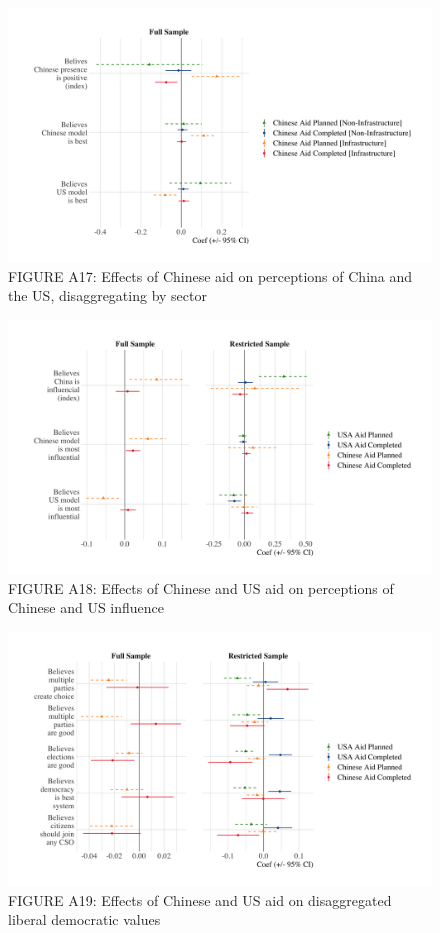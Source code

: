 \documentclass[9pt]{article}
\begin{document}
\begin{figure}[H]
\centering
\includegraphics[width=1\textwidth]{figures/figure_a17.png}
\caption{FIGURE A17: Effects of Chinese aid on perceptions of China and the US, disaggregating by sector}
\end{figure}

\begin{figure}[H]
\centering
\includegraphics[width=1\textwidth]{figures/figure_a18.png}
\caption{FIGURE A18: Effects of Chinese and US aid on perceptions of Chinese and US influence}
\end{figure}

\begin{figure}[H]
\centering
\includegraphics[width=1\textwidth]{figures/figure_a19.png}
\caption{FIGURE A19: Effects of Chinese and US aid on disaggregated liberal democratic values}
\end{figure}
\end{document}
